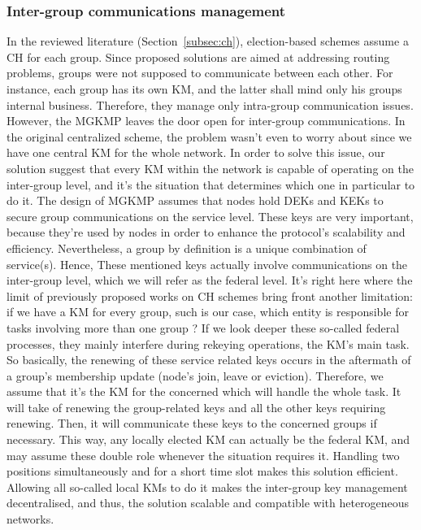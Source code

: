 \subsubsection{Inter-group communications management}

In the reviewed literature (Section~\ref{subsec:ch}), election-based schemes assume a CH for each group. Since proposed solutions are aimed at addressing routing problems, groups were not supposed to communicate between each other. For instance, each group has its own KM, and the latter shall mind only his groups internal business. Therefore, they manage only intra-group communication issues. However, the MGKMP leaves the door open for inter-group communications. In the original centralized scheme, the problem wasn’t even to worry about since we have one central KM for the whole network. In order to solve this issue, our solution suggest that every KM within the network is capable of operating on the inter-group level, and it’s the situation that determines which one in particular to do it. The design of MGKMP assumes that nodes hold DEKs and KEKs to secure group communications on the service level. These keys are very important, because they’re used by nodes in order to enhance the protocol’s scalability and efficiency. Nevertheless, a group by definition is a unique combination of service(s). Hence, These mentioned keys actually involve communications on the inter-group level, which we will refer as the federal level. It’s right here where the limit of previously proposed works on CH schemes bring front another limitation: if we have a KM for every group, such is our case, which entity is responsible for tasks involving more than one group ? If we look deeper these so-called federal processes, they mainly interfere during rekeying operations, the KM’s main task. So basically, the renewing of these service related keys occurs in the aftermath of a group’s membership update (node’s join, leave or eviction). Therefore, we assume that it’s the KM for the concerned which will handle the whole task. It will take of renewing the group-related keys and all the other keys requiring renewing. Then, it will communicate these keys to the concerned groups if necessary. This way, any locally elected KM can actually be the federal KM, and may assume these double role whenever the situation requires it. Handling two positions simultaneously and for a short time slot makes this solution efficient. Allowing all so-called local KMs to do it makes the inter-group key management decentralised, and thus, the solution scalable and compatible with heterogeneous networks.

